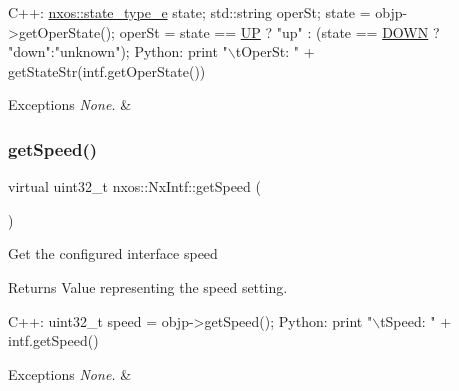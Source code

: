 \begin{DoxyCode}
C++:
    \mbox{\hyperlink{namespacenxos_a7c257059d03188765435b36e95dbb764}{nxos::state\_type\_e}}  state;
    std::string operSt;
    state   = objp->getOperState();
    operSt = state == \mbox{\hyperlink{namespacenxos_a7c257059d03188765435b36e95dbb764a7f57fa197f0e274e5c5d10c64d0f9436}{UP}} ? \textcolor{stringliteral}{"up"} : 
       (state == \mbox{\hyperlink{namespacenxos_a7c257059d03188765435b36e95dbb764aa0756be42dc77ad57cf532f5c02e4c0a}{DOWN}} ? \textcolor{stringliteral}{"down"}:\textcolor{stringliteral}{"unknown"});
Python:
    print \textcolor{stringliteral}{"\(\backslash\)tOperSt: "} + getStateStr(intf.getOperState())      
\end{DoxyCode}



\begin{DoxyExceptions}{Exceptions}
{\em None.} & \\
\hline
\end{DoxyExceptions}
\mbox{\label{classnxos_1_1_nx_intf_ac1fdcdff8093c76a11b06951d2673356}} 
\subsubsection{\texorpdfstring{get\+Speed()}{getSpeed()}}
{\footnotesize\ttfamily virtual uint32\+\_\+t nxos\+::\+Nx\+Intf\+::get\+Speed (\begin{DoxyParamCaption}{ }\end{DoxyParamCaption})\hspace{0.3cm}{\ttfamily [pure virtual]}}

Get the configured interface speed ~\newline
 \begin{DoxyReturn}{Returns}
Value representing the speed setting. ~\newline

\end{DoxyReturn}

\begin{DoxyCode}
C++:
       uint32\_t speed    =  objp->getSpeed();
Python:
       print \textcolor{stringliteral}{"\(\backslash\)tSpeed: "} + intf.getSpeed()
\end{DoxyCode}



\begin{DoxyExceptions}{Exceptions}
{\em None.} & \\
\hline
\end{DoxyExceptions}
\mbox{\label{classnxos_1_1_nx_intf_aa0885ab26e4abfaa8c7e8e8adb9d32ab}} 

